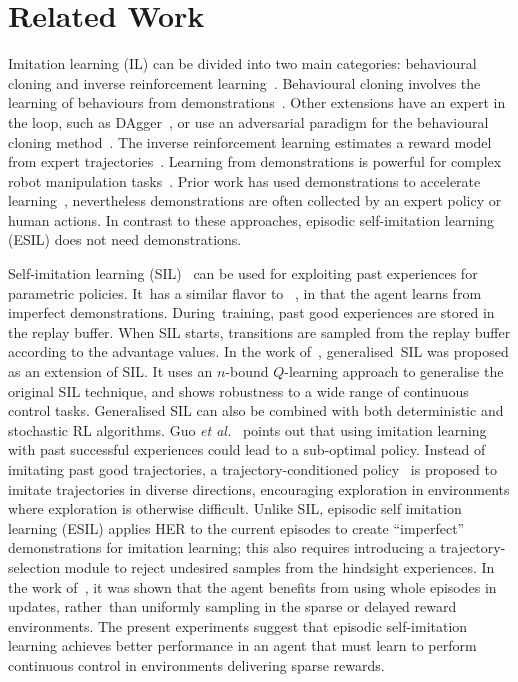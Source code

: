\section{Related Work}
Imitation learning (IL) can be divided into two main categories: behavioural cloning and inverse reinforcement learning~\cite{hussein2017imitation}. Behavioural cloning involves the learning of behaviours from demonstrations~\cite{bojarski2016end,xu2017end,torabi2018behavioral}. Other extensions have an expert in the loop, such as DAgger~\cite{ross2011reduction}, or use an adversarial paradigm for the behavioural cloning method~\cite{ho2016generative,wang2017robust}. The inverse reinforcement learning estimates a reward model from expert trajectories~\cite{ng2000algorithms,abbeel2004apprenticeship,ziebart2008maximum}. Learning from demonstrations is powerful for complex robot manipulation tasks~\cite{finn2016guided,zhang2018deep,pmlr-v78-finn17a,rajeswaran2017learning,fang2019survey}. Prior work has used demonstrations to accelerate  learning~\cite{rajeswaran2017learning,vevcerik2017leveraging,nair2018overcoming},  nevertheless demonstrations are often collected by an expert policy or human actions. In contrast to these approaches, {episodic self-imitation learning (ESIL) does not need demonstrations.}

Self-imitation learning (SIL)~\cite{oh2018self} can be used for exploiting past experiences for parametric policies. It~has a similar flavor to ~\cite{gangwani2018learning, pmlr-v97-wu19a}, in that the agent learns from imperfect demonstrations. During~training, past good experiences are stored in the replay buffer. When SIL starts, transitions are sampled from the replay buffer according to the advantage values. {In the work of~\cite{tang2020self}, generalised~SIL was proposed as an extension of SIL. It uses an $n$-bound $Q$-learning approach to generalise the original SIL technique, and shows robustness to a wide range of continuous control tasks. Generalised SIL can also be combined with both deterministic and stochastic RL algorithms. Guo \textit{et al.}~\cite{guo2019self} points out that using imitation learning with past successful experiences could lead to a sub-optimal policy. Instead of imitating past good trajectories, a trajectory-conditioned policy~\cite{guo2019self} is proposed to imitate trajectories in diverse directions, encouraging exploration in environments where exploration is otherwise difficult.} Unlike SIL, episodic self imitation learning (ESIL) applies HER to the current episodes to create ``imperfect'' demonstrations for imitation learning; this also requires introducing a trajectory-selection module to reject undesired samples from the hindsight experiences. In the work of~\cite{lee2019sample}, it was shown that the agent benefits from using whole episodes in updates, rather~than uniformly sampling in the sparse or delayed reward environments. The present experiments suggest that episodic self-imitation learning {achieves better performance in an agent that must learn to perform continuous control in environments delivering sparse rewards}.

